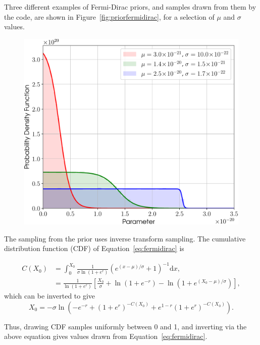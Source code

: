 Three different examples of Fermi-Dirac priors, and samples drawn from them by the code, are shown in Figure~\ref{fig:priorfermidirac},
for a selection of $\mu$ and $\sigma$ values.

\begin{figure}[!phtb]
\begin{center}
\includegraphics[width=1\columnwidth]{./figures/priors/fermidirac/fermidirac}
\caption{ \protect}
\end{center}
\end{figure}

The sampling from the prior uses inverse transform sampling. The cumulative distribution function (CDF) of Equation~\ref{eq:fermidirac}
is
\begin{widetext}
\begin{align}
 C(X_0) &= \int_0^{X_0} \frac{1}{\sigma\ln{\left(1+e^{r} \right)}}\left(e^{(x-\mu)/\sigma} + 1\right)^{-1} \text{d}x, \nonumber \\
 &= \frac{1}{\ln{\left(1+e^{r}\right)}}\left[\frac{X_0}{\sigma} + \ln{\left(1+e^{-r} \right)} - \ln{\left( 1+e^{(X_0-\mu)/\sigma}\right)} \right],
\end{align}
which can be inverted to give
\begin{equation}
X_0 = -\sigma \ln{}\left(-e^{-r} + \left(1+e^{r} \right)^{-C(X_0)} + e^{1-r}\left(1+e^{r} \right)^{-C(X_0)} \right).
\end{equation}
\end{widetext}
Thus, drawing CDF samples uniformly between 0 and 1, and inverting via the above equation gives values drawn from Equation~\ref{eq:fermidirac}.

